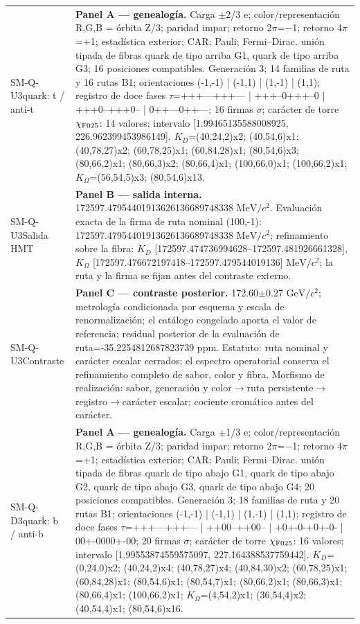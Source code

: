 \begin{longtable}{@{}>{\raggedright\arraybackslash}p{2.55cm}>{\raggedright\arraybackslash}p{11.75cm}@{}}
SM-Q-U3\newline quark: t / anti-t & \textbf{Panel A --- genealogía. }Carga \(\pm\)2/3 e; color/representación R,G,B = órbita Z/3; paridad impar; retorno \(2\pi\)=\(-\)1; retorno \(4\pi\)=+1; estadística exterior; CAR; Pauli; Fermi--Dirac. unión tipada de fibras quark de tipo arriba G1, quark de tipo arriba G3; 16 posiciones compatibles. Generación 3; 14 familias de ruta y 16 rutas B1; orientaciones (-1,-1) | (-1,1) | (1,-1) | (1,1); registro de doce fases \(\tau\)=+++---+++--- | +++--0+++--0 | +++0--+++0-- | 0++---0++---; 16 firmas \(\sigma\); carácter de torre \(\chi_{\rm F025}\): 14 valores; intervalo [1.99465135588008925, 226.962399453986149]. \(K_D\)=(40,24,2)x2; (40,54,6)x1; (40,78,27)x2; (60,78,25)x1; (60,84,28)x1; (80,54,6)x3; (80,66,2)x1; (80,66,3)x2; (80,66,4)x1; (100,66,0)x1; (100,66,2)x1; \(K_{\Omega}\)=(56,54,5)x3; (80,54,6)x13. \\
SM-Q-U3\newline Salida HMT & \textbf{Panel B --- salida interna. }172597.47954401913626136689748338 \(\mathrm{MeV}/c^2\). Evaluación exacta de la firma de ruta nominal (100,-1): 172597.47954401913626136689748338 \(\mathrm{MeV}/c^2\); refinamiento sobre la fibra: \(K_D\) [172597.474736994628--172597.481926661328], \(K_{\Omega}\) [172597.476672197418--172597.479544019136] \(\mathrm{MeV}/c^2\); la ruta y la firma se fijan antes del contraste externo. \\
SM-Q-U3\newline Contraste & \textbf{Panel C --- contraste posterior. }172.60\(\pm\)0.27 \(\mathrm{GeV}/c^2\); metrología condicionada por esquema y escala de renormalización; el catálogo congelado aporta el valor de referencia; residual posterior de la evaluación de ruta=-35.2254812687823739 ppm. Estatuto: ruta nominal y carácter escalar cerrados; el espectro operatorial conserva el refinamiento completo de sabor, color y fibra. Morfismo de realización: sabor, generación y color\(\to\)\allowbreak{}ruta persistente\(\to\)\allowbreak{}registro\(\to\)\allowbreak{}carácter escalar; cociente cromático antes del carácter. \\\addlinespace[2pt]
SM-Q-D3\newline quark: b / anti-b & \textbf{Panel A --- genealogía. }Carga \(\pm\)1/3 e; color/representación R,G,B = órbita Z/3; paridad impar; retorno \(2\pi\)=\(-\)1; retorno \(4\pi\)=+1; estadística exterior; CAR; Pauli; Fermi--Dirac. unión tipada de fibras quark de tipo abajo G1, quark de tipo abajo G2, quark de tipo abajo G3, quark de tipo abajo G4; 20 posiciones compatibles. Generación 3; 18 familias de ruta y 20 rutas B1; orientaciones (-1,-1) | (-1,1) | (1,-1) | (1,1); registro de doce fases \(\tau\)=+++---+++--- | ++00--++00-- | +0+-0-+0+-0- | 00+-0000+-00; 20 firmas \(\sigma\); carácter de torre \(\chi_{\rm F025}\): 16 valores; intervalo [1.99553874559575097, 227.164388537759442]. \(K_D\)=(0,24,0)x2; (40,24,2)x4; (40,78,27)x4; (40,84,30)x2; (60,78,25)x1; (60,84,28)x1; (80,54,6)x1; (80,54,7)x1; (80,66,2)x1; (80,66,3)x1; (80,66,4)x1; (100,66,2)x1; \(K_{\Omega}\)=(4,54,2)x1; (36,54,4)x2; (40,54,4)x1; (80,54,6)x16. \\

\end{longtable}

